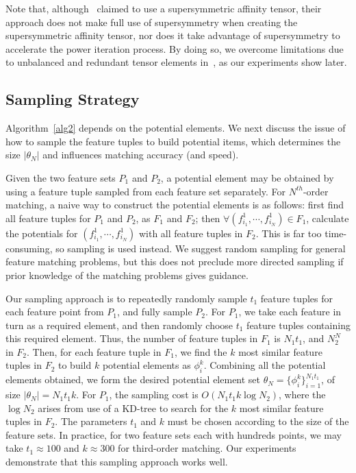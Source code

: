 Note that, although~\cite{Duchenne09,Duchenne2011} claimed to use a supersymmetric affinity tensor,
their approach does not make full use of supersymmetry when creating the supersymmetric affinity tensor,
nor does it take advantage of supersymmetry to accelerate the power iteration process.
By doing so, we overcome limitations due to unbalanced and redundant tensor elements in~\cite{Duchenne09,Duchenne2011}, as our experiments show later.



\subsection{Sampling Strategy}
\label{subsec:sampling}

Algorithm~\ref{alg2} depends on the potential elements.
We next discuss the issue of how to sample the feature tuples to build potential items, which determines the size $|\theta_N|$ and influences matching accuracy (and speed).

Given the two feature sets $P_1$ and $P_2$,
a potential element may be obtained by using a feature tuple sampled from each feature set separately.
For $N^{th}$-order matching, a naive way to construct the potential elements is as follows:
first find all feature tuples for $P_1$ and $P_2$, as $F_1$ and $F_2$; then $\forall (f_{i_1}^1, \cdots, f_{i_N}^1)\in F_1$,
calculate the potentials for $(f_{i_1}^1, \cdots, f_{i_N}^1)$ with all feature tuples in $F_2$.
This is far too time-consuming, so sampling is used instead.
We suggest random sampling for general feature matching problems,
but this does not preclude more directed sampling if prior knowledge of the matching problems gives guidance.

Our sampling approach is to repeatedly randomly sample $t_1$ feature tuples for each feature point from $P_1$, and fully sample $P_2$.
For $P_1$, we take each feature in turn as a required element, and then randomly choose $t_1$ feature tuples containing this required element.
Thus, the number of feature tuples in $F_1$ is $N_1t_1$, and $N_2^N$ in $F_2$.
Then, for each feature tuple in $F_1$, we find the $k$ most similar feature tuples in $F_2$ to build $k$ potential elements as $\phi_i^k$.
Combining all the potential elements obtained, we form the desired potential element set $\theta_N = \{\phi_i^k\}_{i=1}^{N_1 t_1}$, of size $|\theta_N| = N_1 t_1 k$.
For $P_1$, the sampling cost is $O(N_1  t_1 k \log N_2)$, where the $\log N_2$ arises from use of a KD-tree to search for the $k$ most similar feature tuples in $F_2$.
The parameters $t_1$ and $k$ must be chosen according to the size of the feature sets.
In practice, for two feature sets each with hundreds points,
we may take $t_1 \approx 100$ and $k\approx300$ for third-order matching.
Our experiments demonstrate that this sampling approach works well.

